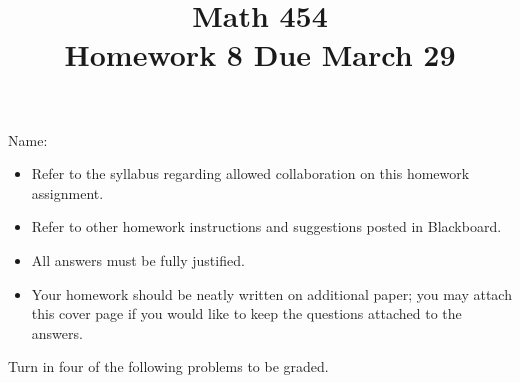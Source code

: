 \documentclass[11pt]{amsart}%
\begin{document}
\title{Math 454\\ Homework 8 %
\qquad Due March 29%
}
\author{}
\date{}
\maketitle
\thispagestyle{empty}

\noindent Name:~\hrulefill~~\\

\begin{itemize}
\item Refer to the syllabus regarding allowed collaboration on this homework assignment.
\item Refer to other homework instructions and suggestions posted in Blackboard.
\item All answers must be fully justified.
\item Your homework should be neatly written on additional paper; you may attach this cover page if you would like to keep the questions attached to the answers.
\end{itemize}

\bigskip
Turn in four of the following problems to be graded.
\bigskip
\end{document}
